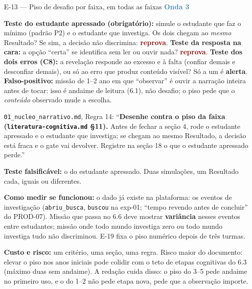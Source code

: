 \documentclass[11pt,a4paper]{article}
\newcommand{\rep}{\textcolor{DarkRed}{\textbf{reprova}}}
\newcommand{\alerta}{\textcolor{DarkYellow}{\textbf{alerta}}}
\newcommand{\onda}[1]{\textcolor{SteelBlue}{\textbf{Onda #1}}}
\begin{document}
\begin{emendabox}{E-13 --- Piso de desafio por faixa, em todas as faixas \hfill \onda{3}}
\begin{depoisbox}
\textbf{Teste do estudante apressado (obrigatório):} simule o estudante que faz o mínimo
(padrão P2) e o estudante que investiga. Os dois chegam ao \emph{mesmo} Resultado? Se sim, a
decisão não discrimina: \rep. \textbf{Teste da resposta na cara:} a opção ``certa'' se identifica
sem ler ou ouvir nada? \rep. \textbf{Teste dos dois erros (C8):} a revelação responde ao excesso e
à falta (confiar demais e desconfiar demais), ou só ao erro que produz conteúdo visível? Só a um
é \alerta. \textbf{Falso-positivo:} missão de 1\textordmasculine{}--2\textordmasculine{} ano em que
``observar'' é ouvir a narração inteira antes de tocar: isso é andaime de leitura (6.1), não
desafio; o piso pede que o \emph{conteúdo} observado mude a escolha.
\end{depoisbox}

\begin{depoisbox}\small
\texttt{01\_nucleo\_narrativo.md}, Regra 14: ``\textbf{Desenhe contra o piso da faixa
(\texttt{literatura-cognitiva.md} \S11).} Antes de fechar a seção 4, rode o estudante apressado e o
estudante que investiga; se chegam ao mesmo Resultado, a decisão está fraca e o gate vai devolver.
Registre na seção 18 o que o estudante apressado perde.''
\end{depoisbox}

\textbf{Teste falsificável:} o do estudante apressado. Duas simulações, um Resultado cada,
iguais ou diferentes.

\textbf{Como medir se funcionou:} o dado já existe na plataforma: os eventos de investigação
(\texttt{abriu\_busca}, \texttt{buscou} na exp-01; ``tempo revendo antes de concluir'' do PROD-07).
Missão que passa no 6.6 deve mostrar \textbf{variância} nesses eventos entre estudantes; missão
onde todo mundo investiga zero ou todo mundo investiga tudo não discriminou. E-19 fixa o piso
numérico depois de três turmas.

\textbf{Custo e risco:} um critério, uma seção, uma regra. Risco maior do documento: elevar o
piso nos anos iniciais pode colidir com o teto de etapas cognitivas do 6.3 (máximo duas sem
andaime). A redação cuida disso: o piso do 3\textordmasculine{}--5\textordmasculine{} pede
andaime no primeiro uso, e o do 1\textordmasculine{}--2\textordmasculine{} não pede etapa nova,
pede que a observação importe.
\end{emendabox}
\end{document}
